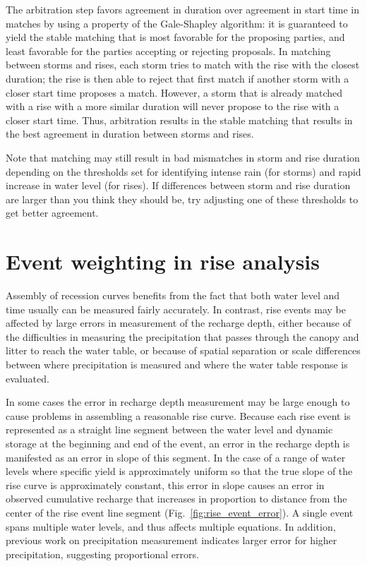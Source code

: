\documentclass[11pt,a4paper]{article}
\begin{document}
The arbitration step favors agreement in duration over agreement in
start time in matches by using a property of the Gale-Shapley
algorithm: it is guaranteed to yield the stable matching that is most
favorable for the proposing parties, and least favorable for the
parties accepting or rejecting proposals.  In matching between storms
and rises, each storm tries to match with the rise with the closest
duration; the rise is then able to reject that first match if another
storm with a closer start time proposes a match.  However, a storm
that is already matched with a rise with a more similar duration will
never propose to the rise with a closer start time.  Thus, arbitration
results in the stable matching that results in the best agreement in
duration between storms and rises.

Note that matching may still result in bad mismatches in storm and
rise duration depending on the thresholds set for identifying intense
rain (for storms) and rapid increase in water level (for rises).  If
differences between storm and rise duration are larger than you think
they should be, try adjusting one of these thresholds to get better
agreement.

\section{Event weighting in rise analysis}
\label{b:rise_weighting}

Assembly of recession curves benefits from the fact that both water
level and time usually can be measured fairly accurately.  In
contrast, rise events may be affected by large errors in measurement
of the recharge depth, either because of the difficulties in measuring
the precipitation that passes through the canopy and litter to reach
the water table, or because of spatial separation or scale differences
between where precipitation is measured and where the water table
response is evaluated.

In some cases the error in recharge depth measurement may be large
enough to cause problems in assembling a reasonable rise curve.
Because each rise event is represented as a straight line segment
between the water level and dynamic storage at the beginning and end
of the event, an error in the recharge depth is manifested as an error
in slope of this segment.  In the case of a range of water levels
where specific yield is approximately uniform so that the true slope
of the rise curve is approximately constant, this error in slope
causes an error in observed cumulative recharge that increases in
proportion to distance from the center of the rise event line segment
(Fig.~\ref{fig:rise_event_error}).  A single event spans multiple
water levels, and thus affects multiple equations.  In addition,
previous work on precipitation measurement indicates larger error for
higher precipitation, suggesting proportional errors.
\end{document}
